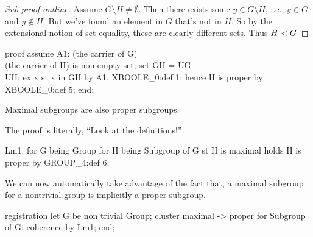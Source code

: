 \begin{proof}[Sub-proof outline]
Assume $G\setminus H\neq\emptyset$. Then there exists some $y\in
G\setminus H$, i.e., $y\in G$ and $y\notin H$. But we've found an
element in $G$ that's not in $H$. So by the extensional notion of set
equality, these are clearly different sets. Thus $H< G$
\end{proof}

\nwenddocs{}\endmoddef\nwstartdeflinemarkup{}\nwenddeflinemarkup
proof
  assume A1: (the carrier of G) \\ (the carrier of H) is non empty set;
  set GH = UG \\ UH;
  ex x st x in GH by A1, XBOOLE_0:def 1;
  hence H is proper by XBOOLE_0:def 5;
end;
\nwendcode{}\nwdocspar

\begin{lemma}
Maximal subgroups are also proper subgroups.
\end{lemma}

The proof is literally, ``Look at the definitions!''

\nwenddocs{}\endmoddef\nwstartdeflinemarkup{}\nwenddeflinemarkup
Lm1:
  for G being Group
  for H being Subgroup of G
  st H is maximal
  holds H is proper by GROUP_4:def 6;
\eatline
{}\nwendcode{}\nwdocspar
\begin{registration}
We can now automatically take advantage of the fact that, a maximal
subgroup for a nontrivial group is implicitly a proper subgroup.
\end{registration}

\nwenddocs{}\endmoddef\nwstartdeflinemarkup{}\nwenddeflinemarkup
registration
  let G be non trivial Group;
  cluster maximal -> proper for Subgroup of G;
  coherence by Lm1;
end;
\nwendcode{}\nwdocspar

